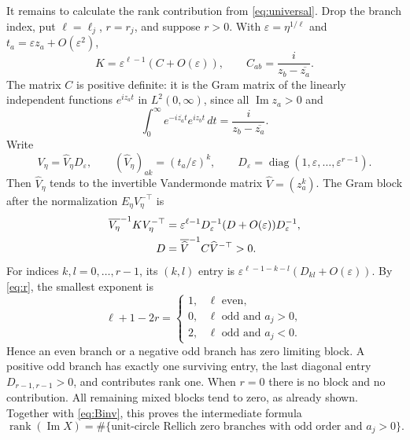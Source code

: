 \documentclass[11pt]{article}
\newcommand{\Ima}{\operatorname{Im}}
\newcommand{\rank}{\operatorname{rank}}
\newcommand{\diag}{\operatorname{diag}}
\begin{document}
It remains to calculate the rank contribution from \eqref{eq:universal}.
Drop the branch index, put $\ell=\ell_j$, $r=r_j$, and suppose $r>0$.
With $\varepsilon=\eta^{1/\ell}$ and $t_a=\varepsilon z_a+O(\varepsilon^2)$,
\begin{equation}\label{eq:Ckernel}
K=\varepsilon^{\ell-1}(C+O(\varepsilon)),
\qquad C_{ab}=\frac{i}{z_b-\overline{z_a}}.
\end{equation}
The matrix $C$ is positive definite: it is the Gram matrix of the linearly independent
functions $e^{iz_at}$ in $L^2(0,\infty)$, since all $\Ima z_a>0$ and
\[
\int_0^\infty e^{-i\overline{z_a}t}e^{iz_bt}\,dt
=\frac{i}{z_b-\overline{z_a}}.
\]
Write
\[
V_\eta=\widehat V_\eta D_\varepsilon,
\qquad (\widehat V_\eta)_{ak}=(t_a/\varepsilon)^k,
\qquad D_\varepsilon=\diag(1,\varepsilon,\ldots,\varepsilon^{r-1}).
\]
Then $\widehat V_\eta$ tends to the invertible Vandermonde matrix $\widehat V=(z_a^k)$.
The Gram block after the normalization $E_\eta V_\eta^{-\top}$ is
\begin{align}
\overline{V_\eta}^{-1}KV_\eta^{-\top}
&=\varepsilon^{\ell-1}D_\varepsilon^{-1}
   (D+O(\varepsilon))D_\varepsilon^{-1},\label{eq:scaledGram}\\
D&=\overline{\widehat V}^{-1}C\widehat V^{-\top}>0.\notag
\end{align}
For indices $k,l=0,\ldots,r-1$, its $(k,l)$ entry is
$\varepsilon^{\ell-1-k-l}(D_{kl}+O(\varepsilon))$.
By \eqref{eq:r}, the smallest exponent is
\[
\ell+1-2r=
\begin{cases}
1,&\ell\text{ even},\\
0,&\ell\text{ odd and }a_j>0,\\
2,&\ell\text{ odd and }a_j<0.
\end{cases}
\]
Hence an even branch or a negative odd branch has zero limiting block.
A positive odd branch has exactly one surviving entry, the last diagonal entry
$D_{r-1,r-1}>0$, and contributes rank one. When $r=0$ there is no block and no contribution.
All remaining mixed blocks tend to zero, as already shown. Together with
\eqref{eq:Binv}, this proves the intermediate formula
\begin{equation}\label{eq:signedrank}
\rank(\Ima X)=\#\{\text{unit-circle Rellich zero branches with odd order and }a_j>0\}.
\end{equation}
\end{document}
